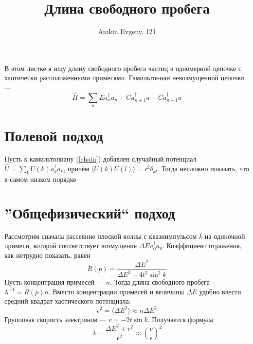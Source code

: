 \documentclass{article}
\title{Длина свободного пробега}
\author{Anikin Evgeny, 121}
\begin{document}
\maketitle
В этом листке я ищу длину свободного пробега частиц в одномерной цепочке с хаотически 
расположенными примесями. Гамильтониан невозмущенной цепочки --- 
\begin{equation}
	\label{chain}
	\hat{H} = \sum_n Ea_n^\dagger a_n + Ca_{n+1}^\dagger a + Ca_{n-1}^\dagger a
\end{equation}
\section{Полевой подход}
Пусть к камильтониану (\ref{chain}) добавлен случайный потенциал 
$\hat{U} = \sum_k U(k) a_k^\dagger a_k$, причём 
$\langle U(k) U(l)\rangle = \epsilon^2\delta_{kl}$. Тогда несложно показать, что в самом
низком порядке
\section{''Общефизический`` подход}
Рассмотрим сначала рассеяние плоской волны с квазиимпульсом $k$ на одиночной примеси,
которой соответствует возмущение $\Delta E a_0^\dagger a_0$.
Коэффициент отражения,
как нетрудно показать, равен
\begin{equation}
	R(p) = \frac{\Delta E^2}{\Delta E^2 + 4t^2 \sin^2{k}}
\end{equation}
Пусть концентрация примесей --- $n$. Тогда длина свободного пробега ---  
$\lambda^{-1} = R(p)n$. 
Вместо концентрации примесей и величины $\Delta E$ удобно ввести средний квадрат 
хаотического потенциала:
\begin{equation}
	\epsilon^2 = \langle \Delta E^2 \rangle \approx n\Delta E^2
\end{equation}
Групповая скорость электронов --- $v = -2t\sin k$. 
Получается формула
\begin{equation}
	\lambda = \frac{\Delta E^2 + v^2}{\epsilon^2} \approx \left(\frac{v}{\epsilon}\right)^2
\end{equation}
\end{document}
